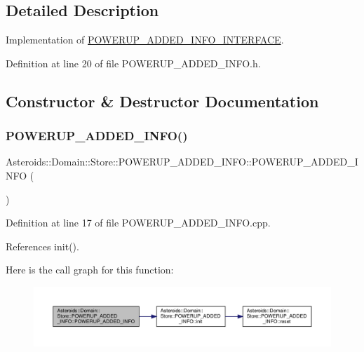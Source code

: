 \subsection{Detailed Description}
Implementation of \hyperlink{classAsteroids_1_1Domain_1_1Store_1_1POWERUP__ADDED__INFO__INTERFACE}{P\+O\+W\+E\+R\+U\+P\+\_\+\+A\+D\+D\+E\+D\+\_\+\+I\+N\+F\+O\+\_\+\+I\+N\+T\+E\+R\+F\+A\+CE}. 

Definition at line 20 of file P\+O\+W\+E\+R\+U\+P\+\_\+\+A\+D\+D\+E\+D\+\_\+\+I\+N\+F\+O.\+h.



\subsection{Constructor \& Destructor Documentation}
\mbox{\label{classAsteroids_1_1Domain_1_1Store_1_1POWERUP__ADDED__INFO_ac735fa85a1732bfc02f7f7534379f306}} 
\subsubsection{\texorpdfstring{P\+O\+W\+E\+R\+U\+P\+\_\+\+A\+D\+D\+E\+D\+\_\+\+I\+N\+F\+O()}{POWERUP\_ADDED\_INFO()}}
{\footnotesize\ttfamily Asteroids\+::\+Domain\+::\+Store\+::\+P\+O\+W\+E\+R\+U\+P\+\_\+\+A\+D\+D\+E\+D\+\_\+\+I\+N\+F\+O\+::\+P\+O\+W\+E\+R\+U\+P\+\_\+\+A\+D\+D\+E\+D\+\_\+\+I\+N\+FO (\begin{DoxyParamCaption}{ }\end{DoxyParamCaption})}



Definition at line 17 of file P\+O\+W\+E\+R\+U\+P\+\_\+\+A\+D\+D\+E\+D\+\_\+\+I\+N\+F\+O.\+cpp.



References init().

Here is the call graph for this function\+:\nopagebreak
\begin{figure}[H]
\begin{center}
\leavevmode
\includegraphics[width=350pt]{classAsteroids_1_1Domain_1_1Store_1_1POWERUP__ADDED__INFO_ac735fa85a1732bfc02f7f7534379f306_cgraph}
\end{center}
\end{figure}


